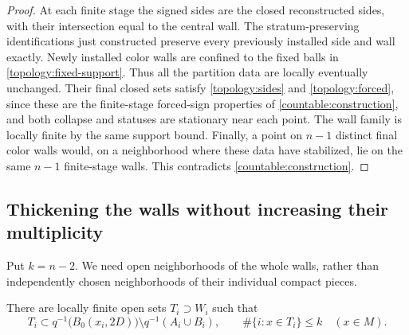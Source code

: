 \begin{proof}
At each finite stage the signed sides are the closed reconstructed
sides, with their intersection equal to the central wall.  The
stratum-preserving identifications just constructed preserve every
previously installed side and wall exactly.  Newly installed color
walls are confined to the fixed balls in
\eqref{topology:fixed-support}.  Thus all the partition data are locally
eventually unchanged.  Their final closed sets satisfy
\eqref{topology:sides} and \eqref{topology:forced}, since these are the
finite-stage forced-sign properties of
\cref{countable:construction}, and both collapse and statuses are
stationary near each point.  The wall family is locally finite by the
same support bound.  Finally, a point on $n-1$ distinct final color
walls would, on a neighborhood where these data have stabilized, lie
on the same $n-1$ finite-stage walls.  This contradicts
\cref{countable:construction}.
\end{proof}

\subsection{Thickening the walls without increasing their multiplicity}

Put $k=n-2$.  We need open neighborhoods of the whole walls, rather
than independently chosen neighborhoods of their individual compact
pieces.

\begin{lemma}\label{topology:thicken}
There are locally finite open sets $T_i\supset W_i$ such that
\begin{equation}\label{topology:thickening}
 T_i\subset q^{-1}\bigl(B_0(x_i,2D)\bigr)
                  \setminus q^{-1}(A_i\cup B_i),
 \qquad
 \#\{i:x\in T_i\}\le k\quad(x\in M).
\end{equation}
\end{lemma}

